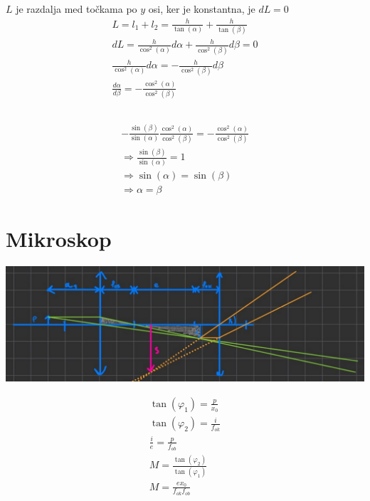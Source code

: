 \documentclass[a4paper,12pt]{article}
\begin{document}
\subsection{}
$L$ je razdalja med točkama po $y$ osi, ker je konstantna, je $dL = 0$
\begin{align}
    L = l_1 + l_2 = \frac{h}{\tan(\alpha)} + \frac{h}{\tan(\beta)}             \\
    dL = \frac{h}{\cos^2(\alpha)} d\alpha + \frac{h}{\cos^2(\beta)} d\beta = 0 \\
    \frac{h}{\cos^2(\alpha)} d\alpha = -\frac{h}{\cos^2(\beta)} d\beta         \\
    \frac{d \alpha}{d \beta} = -\frac{\cos^2(\alpha)}{\cos^2(\beta)}
\end{align}

\subsection{}
\begin{align}
    -\frac{\sin(\beta)}{\sin(\alpha)} \frac{\cos^2(\alpha)}{\cos^2(\beta)}= -\frac{\cos^2(\alpha)}{\cos^2(\beta)} \\
    \Rightarrow \frac{\sin(\beta)}{\sin(\alpha)} = 1                                                              \\
    \Rightarrow \sin(\alpha) = \sin(\beta)                                                                        \\
    \Rightarrow \alpha = \beta
\end{align}

\newpage
\section{Mikroskop}\label{sec:mikroskop}
\includegraphics[width=\textwidth]{mikroskop.png}

\begin{align}
    \tan(\varphi_1) = \frac{p}{x_0}             \\
    \tan(\varphi_2) = \frac{i}{f_{ok}}          \\
    \frac{i}{e} = \frac{p}{f_{ob}}              \\
    M = \frac{\tan(\varphi_2)}{\tan(\varphi_1)} \\
    M = \frac{e x_0}{f_{ok} f_{ob}}
\end{align}
\end{document}

